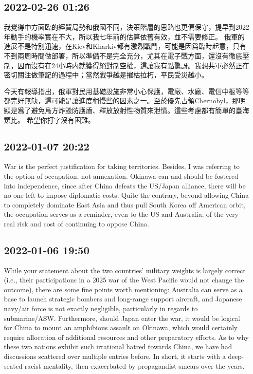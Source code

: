 \documentclass[twocolumn]{ctexart}
\begin{document}
\subsection*{2022-02-26 01:26}

我覺得中方面臨的經貿局勢和俄國不同，決策階層的思路也更偏保守，提早到2022年動手的機率實在不大，所以我七年前的估算依舊有效，並不需要修正。
俄軍的進展不是特別迅速，在Kiev和Kharkiv都有激烈戰鬥，可能是因爲臨時起意，只有不到兩周時間做部署，所以準備不是完全充分，尤其在電子戰方面，還沒有徹底壓制，因而沒有在24小時内就獲得絕對制空權，這讓我有點驚訝。我想共軍必然正在密切關注做筆記的過程中；當然戰爭越是摧枯拉朽，平民受災越小。

今天有報導指出，俄軍對民用基礎設施非常小心保護，電廠、水廠、電信中樞等等都完好無缺，這可能是讓進度稍慢些的因素之一。至於優先占領Chernobyl，那明顯是爲了避免烏方炸毀防護盾、釋放放射性物質來泄憤。這些考慮都有簡單的臺海類比。
希望你打字沒有困難。
\subsection*{2022-01-07 20:22}

War is the perfect justification for taking territories. Besides, I was referring to the option of occupation, not annexation. Okinawa can and should be fostered into independence, since after China defeats the US/Japan alliance, there will be no one left to impose diplomatic costs. Quite the contrary, beyond allowing China to completely dominate East Asia and thus pull South Korea off American orbit, the occupation serves as a reminder, even to the US and Australia, of the very real risk and cost of continuing to oppose China.
\subsection*{2022-01-06 19:50}

While your statement about the two countries' military weights is largely correct (i.e., their participations in a 2025 war of the West Pacific would not change the outcome), there are some fine points worth mentioning: Australia can serve as a base to launch strategic bombers and long-range support aircraft, and Japanese navy/air force is not exactly negligible, particularly in regards to submarine/ASW. Furthermore, should Japan enter the war, it would be logical for China to mount an amphibious assault on Okinawa, which would certainly require allocation of additional resources and other preparatory efforts.
As to why these two nations exhibit such irrational hatred towards China, we have had discussions scattered over multiple entries before. In short, it starts with a deep-seated racist mentality, then exacerbated by propagandist smears over the years.
\end{document}

